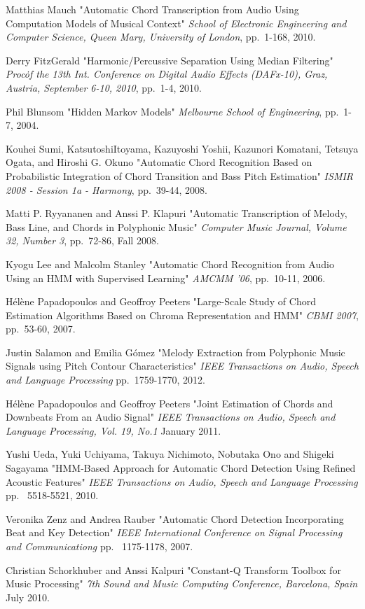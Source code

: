 \documentclass{article}
\begin{document}
\begin{thebibliography}{citations}
Matthias Mauch
"Automatic Chord Transcription from Audio Using Computation Models of Musical Context"
{\it School of Electronic Engineering and Computer Science, Queen Mary, University of London},
pp.~1-168, 2010.

Derry FitzGerald
"Harmonic/Percussive Separation Using Median Filtering"
{\it Proc\. of the 13th Int. Conference on Digital Audio Effects (DAFx-10), Graz, Austria, September 6-10, 2010},
pp.~1-4, 2010.

Phil Blunsom
"Hidden Markov Models"
{\it Melbourne School of Engineering},
pp.~1-7, 2004.

Kouhei Sumi, KatsutoshiItoyama, Kazuyoshi Yoshii, Kazunori Komatani, Tetsuya Ogata, and Hiroshi G. Okuno
"Automatic Chord Recognition Based on Probabilistic Integration of Chord Transition and Bass Pitch Estimation"
{\it ISMIR 2008 - Session 1a - Harmony},
pp.~39-44, 2008.

Matti P. Ryyananen and Anssi P. Klapuri
"Automatic Transcription of Melody, Bass Line, and Chords in Polyphonic Music"
{\it Computer Music Journal, Volume 32, Number 3},
pp.~72-86, Fall 2008.

Kyogu Lee and Malcolm Stanley
"Automatic Chord Recognition from Audio Using an HMM with Supervised Learning"
{\it AMCMM '06},
pp.~10-11, 2006.

Hélène Papadopoulos and Geoffroy Peeters
"Large-Scale Study of Chord Estimation Algorithms Based on Chroma Representation and HMM"
{\it CBMI 2007},
pp.~53-60, 2007.

Justin Salamon and Emilia G{\'o}mez
"Melody Extraction from Polyphonic Music Signals using Pitch Contour Characteristics"
{\it IEEE Transactions on Audio, Speech and Language Processing}
pp.~1759-1770, 2012.

Hélène Papadopoulos and Geoffroy Peeters
"Joint Estimation of Chords and Downbeats From an Audio Signal"
{\it IEEE Transactions on Audio, Speech and Language Processing, Vol. 19, No.1}
January 2011.

Yushi Ueda, Yuki Uchiyama, Takuya Nichimoto, Nobutaka Ono and Shigeki Sagayama
"HMM-Based Approach for Automatic Chord Detection Using Refined Acoustic Features"
{\it IEEE Transactions on Audio, Speech and Language Processing}
pp. ~5518-5521, 2010.

Veronika Zenz and Andrea Rauber
"Automatic Chord Detection Incorporating Beat and Key Detection"
{\it IEEE International Conference on Signal Processing and Communicationg}
pp. ~1175-1178, 2007.

Christian Schorkhuber and Anssi Kalpuri
"Constant-Q Transform Toolbox for Music Processing"
{\it 7th Sound and Music Computing Conference, Barcelona, Spain}
July 2010.


\end{thebibliography}


\end{document}
